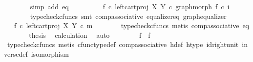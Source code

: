 \begin{isabellebody}
\ \ \ \ \ \ \isamarkupfalse%
\ {\isacharparenleft}{\kern0pt}simp\ add{\isacharcolon}{\kern0pt}\ eq{}{\isacharparenright}{\kern0pt}\isanewline
\ \ \ \ \isamarkupfalse%
\ \isamarkupfalse%
\ {\isachardoublequoteopen}{\isachardot}{\kern0pt}{\isachardot}{\kern0pt}{\isachardot}{\kern0pt}\ {\isacharequal}{\kern0pt}\ {\isacharparenleft}{\kern0pt}f{}\ {\isasymcirc}\isactrlsub c\ left{\isacharunderscore}{\kern0pt}cart{\isacharunderscore}{\kern0pt}proj\ X\ Y{\isacharparenright}{\kern0pt}\ {\isasymcirc}\isactrlsub c\ graph{\isacharunderscore}{\kern0pt}morph\ f{}\ {\isasymcirc}\isactrlsub c\ i{}{\isachardoublequoteclose}\isanewline
\ \ \ \ \ \ \isamarkupfalse%
\ {\isacharparenleft}{\kern0pt}typecheck{\isacharunderscore}{\kern0pt}cfuncs{\isacharcomma}{\kern0pt}\ smt\ comp{\isacharunderscore}{\kern0pt}associative{}\ equalizer{\isacharunderscore}{\kern0pt}eq\ graph{\isacharunderscore}{\kern0pt}equalizer{}{\isacharparenright}{\kern0pt}\isanewline
\ \ \ \ \isamarkupfalse%
\ \isamarkupfalse%
\ {\isachardoublequoteopen}{\isachardot}{\kern0pt}{\isachardot}{\kern0pt}{\isachardot}{\kern0pt}\ {\isacharequal}{\kern0pt}\ f{}\ {\isasymcirc}\isactrlsub c\ left{\isacharunderscore}{\kern0pt}cart{\isacharunderscore}{\kern0pt}proj\ X\ Y\ {\isasymcirc}\isactrlsub c\ m{\isachardoublequoteclose}\isanewline
\ \ \ \ \ \ \isamarkupfalse%
\ {\isacharparenleft}{\kern0pt}typecheck{\isacharunderscore}{\kern0pt}cfuncs{\isacharcomma}{\kern0pt}\ metis\ comp{\isacharunderscore}{\kern0pt}associative{}\ eq{}{\isacharparenright}{\kern0pt}\isanewline
\ \ \ \ \isamarkupfalse%
\ \isamarkupfalse%
\ {\isacharquery}{\kern0pt}thesis\ \isamarkupfalse%
\ calculation\ \isamarkupfalse%
\ auto\isanewline
\ \ \isamarkupfalse%
\isanewline
\ \ \isamarkupfalse%
\ \isamarkupfalse%
\ {\isachardoublequoteopen}f{}\ {\isacharequal}{\kern0pt}\ f{}{\isachardoublequoteclose}\isanewline
\ \ \ \ \isamarkupfalse%
\ {\isacharparenleft}{\kern0pt}typecheck{\isacharunderscore}{\kern0pt}cfuncs{\isacharcomma}{\kern0pt}\ metis\ cfunc{\isacharunderscore}{\kern0pt}type{\isacharunderscore}{\kern0pt}def\ comp{\isacharunderscore}{\kern0pt}associative\ h{\isacharunderscore}{\kern0pt}def\ h{\isacharunderscore}{\kern0pt}type\ id{\isacharunderscore}{\kern0pt}right{\isacharunderscore}{\kern0pt}unit{}\ inverse{\isacharunderscore}{\kern0pt}def{}\ isomorphism{\isacharparenright}{\kern0pt}\isanewline
{}\isamarkupfalse%
%
\endisatagproof
{\isafoldproof}%
%
\isadelimproof
\isanewline
%
\endisadelimproof
%
\isadelimtheory
\isanewline
%
\endisadelimtheory
%
\isatagtheory
{}\isamarkupfalse%
%
\endisatagtheory
{\isafoldtheory}%
%
\isadelimtheory
%
\endisadelimtheory
%
\end{isabellebody}%
